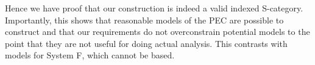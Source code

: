 Hence we have proof that our construction is indeed a valid indexed S-category. Importantly, this shows that reasonable models of the PEC are possible to construct and that our requirements do not overconstrain potential models to the point that they are not useful for doing actual analysis. This contrasts with models for System F, which cannot be \set\s based\cite{PolymorphismIsNotSetTheoretic}.